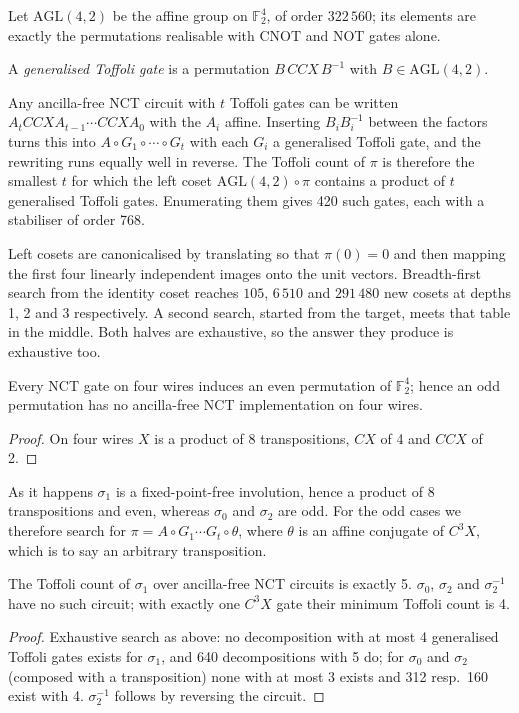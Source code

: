 \documentclass[runningheads,10pt]{llncs}
\begin{document}
Let $\mathrm{AGL}(4,2)$ be the affine group on $\mathbb{F}_2^4$, of order $322\,560$; its elements are exactly the permutations realisable with CNOT and NOT gates alone.

\begin{definition}
A \emph{generalised Toffoli gate} is a permutation $B\,CCX\,B^{-1}$ with $B \in \mathrm{AGL}(4,2)$.
\end{definition}

Any ancilla-free NCT circuit with $t$ Toffoli gates can be written $A_t CCX A_{t-1} \cdots CCX A_0$ with the $A_i$ affine. Inserting $B_i B_i^{-1}$ between the factors turns this into $A \circ G_1 \circ \cdots \circ G_t$ with each $G_i$ a generalised Toffoli gate, and the rewriting runs equally well in reverse. The Toffoli count of $\pi$ is therefore the smallest $t$ for which the left coset $\mathrm{AGL}(4,2)\circ\pi$ contains a product of $t$ generalised Toffoli gates. Enumerating them gives 420 such gates, each with a stabiliser of order 768.

Left cosets are canonicalised by translating so that $\pi(0)=0$ and then mapping the first four linearly independent images onto the unit vectors. Breadth-first search from the identity coset reaches $105$, $6\,510$ and $291\,480$ new cosets at depths 1, 2 and 3 respectively. A second search, started from the target, meets that table in the middle. Both halves are exhaustive, so the answer they produce is exhaustive too.

\begin{lemma}
\label{lem:even-permutation}
Every NCT gate on four wires induces an even permutation of $\mathbb{F}_2^4$; hence an odd permutation has no ancilla-free NCT implementation on four wires.
\end{lemma}
\begin{proof}
On four wires $X$ is a product of 8 transpositions, $CX$ of 4 and $CCX$ of 2.
\end{proof}

As it happens $\sigma_1$ is a fixed-point-free involution, hence a product of 8 transpositions and even, whereas $\sigma_0$ and $\sigma_2$ are odd. For the odd cases we therefore search for $\pi = A \circ G_1 \cdots G_t \circ \theta$, where $\theta$ is an affine conjugate of $C^3X$, which is to say an arbitrary transposition.

\begin{proposition}
\label{prop:min-toffoli}
The Toffoli count of $\sigma_1$ over ancilla-free NCT circuits is exactly 5. $\sigma_0$, $\sigma_2$ and $\sigma_2^{-1}$ have no such circuit; with exactly one $C^3X$ gate their minimum Toffoli count is 4.
\end{proposition}
\begin{proof}
Exhaustive search as above: no decomposition with at most 4 generalised Toffoli gates exists for $\sigma_1$, and 640 decompositions with 5 do; for $\sigma_0$ and $\sigma_2$ (composed with a transposition) none with at most 3 exists and 312 resp.\ 160 exist with 4. $\sigma_2^{-1}$ follows by reversing the circuit.
\end{proof}
\end{document}
